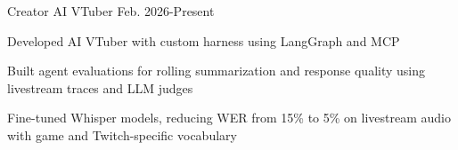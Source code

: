 

\begin{cventries}

  \cventry
    {Creator} %
    {AI VTuber} %
    {} %
    {Feb. 2026-Present} %
    {
      \begin{cvitems} %
        \item {Developed AI VTuber with custom harness using LangGraph and MCP}
        \item {Built agent evaluations for rolling summarization and response quality using livestream traces and LLM judges}
        \item {Fine-tuned Whisper models, reducing WER from 15\% to 5\% on livestream audio with game and Twitch-specific vocabulary}
      \end{cvitems}
    }

\end{cventries}
